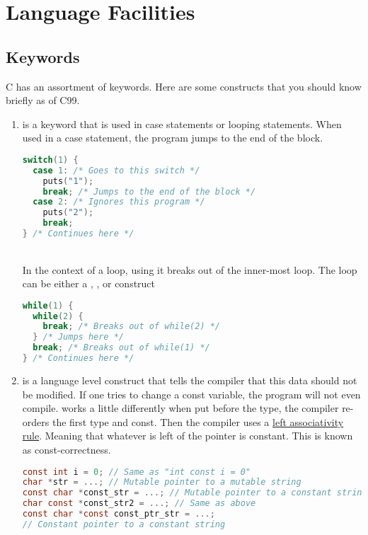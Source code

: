\section{Language Facilities}

\subsection{Keywords}

C has an assortment of keywords.
Here are some constructs that you should know briefly as of C99.


\begin{enumerate}
\item {} is a keyword that is used in case statements or looping statements.
  When used in a case statement, the program jumps to the end of the block.
	      \\
\begin{lstlisting}[language=C]
switch(1) {
  case 1: /* Goes to this switch */
    puts("1");
    break; /* Jumps to the end of the block */
  case 2: /* Ignores this program */
    puts("2");
    break;
} /* Continues here */
\end{lstlisting}
	      \\
	      In the context of a loop, using it breaks out of the inner-most loop.
        The loop can be either a , , or  construct
	      \\
\begin{lstlisting}[language=C]
while(1) {
  while(2) {
    break; /* Breaks out of while(2) */
  } /* Jumps here */
  break; /* Breaks out of while(1) */
} /* Continues here */
\end{lstlisting}
	    \item {} is a language level construct that tells the compiler that this data should not be modified.
        If one tries to change a const variable, the program will not even compile.
         works a little differently when put before the type, the compiler re-orders the first type and const.
        Then the compiler uses a \href{https://en.wikipedia.org/wiki/Operator_associativity}{left associativity rule}.
        Meaning that whatever is left of the pointer is constant.
        This is known as const-correctness.
	      \\
\begin{lstlisting}[language=C]
const int i = 0; // Same as "int const i = 0"
char *str = ...; // Mutable pointer to a mutable string
const char *const_str = ...; // Mutable pointer to a constant string
char const *const_str2 = ...; // Same as above
const char *const const_ptr_str = ...;
// Constant pointer to a constant string
\end{lstlisting}


\end{enumerate}
